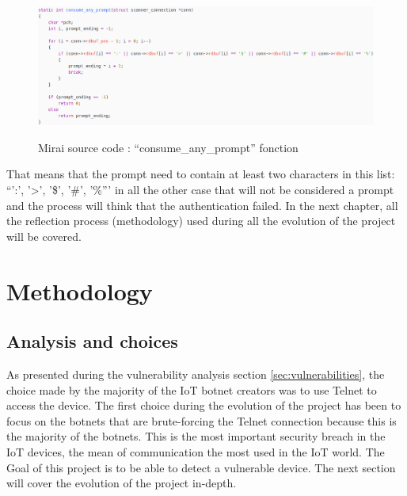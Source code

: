 \documentclass{report}
\begin{document}
\begin{figure}
  \caption{Mirai source code : ``consume\_any\_prompt'' fonction}
 \centering
 \includegraphics[width=1.2\textwidth]{./img/mirai-prompt}
 \label{fig:mirai-prompt}
\end{figure}
That means that the prompt need to contain at least two characters in this list: ``':', '>', '\$', '\#', '\%''' in all the other case that will not be considered a prompt and the process will think that the authentication failed.\newline
In the next chapter, all the reflection process (methodology) used during all the evolution of the project will be covered.

\chapter{Methodology}
\section{Analysis and choices}
As presented during the vulnerability analysis section \ref{sec:vulnerabilities}, the choice made by the majority of the IoT botnet creators was to use Telnet to access the device. \newline
The first choice during the evolution of the project has been to focus on the botnets that are brute-forcing the Telnet connection because this is the majority of the botnets.
This is the most important security breach in the IoT devices, the mean of communication the most used in the IoT world. The Goal of this project is to be able to detect a vulnerable device.\newline
The next section will cover the evolution of the project in-depth.
\end{document}
